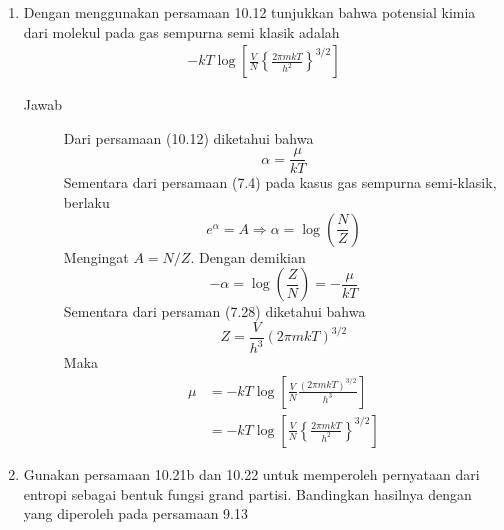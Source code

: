 \documentclass[a4paper , 12 pt]{article}
\begin{document}
\begin{enumerate}
\begin{description}
	\end{description}
\item
	Dengan menggunakan persamaan 10.12 tunjukkan bahwa potensial kimia dari molekul pada gas sempurna semi klasik adalah
	\begin{align}
	-k T \log \left [ \frac{V}{N} 
	 \left \{ \frac{2 \pi m k T}{h^2} \right \}^{3/2} 
	\right ] \nonumber
	\end{align}
	\begin{description}
	\item[Jawab]
	Dari persamaan (10.12) diketahui bahwa 
	\[
	\alpha = \frac{\mu}{kT} \tag{iii.1}
	\]
	Sementara dari persamaan (7.4) pada kasus gas sempurna semi-klasik, berlaku
	\[
	e^\alpha = A \Rightarrow  \alpha = \log \left(\frac{N}{Z}\right) 
	\]
	Mengingat $A = N/Z$. Dengan demikian
	\[
	-\alpha = \log \left(\frac{Z}{N}\right) = - \frac{\mu}{kT}
	\]
	Sementara dari persaman (7.28) diketahui bahwa
	\[
	Z = \frac{V}{h^3} (2\pi m kT)^{3/2}
	\]
	Maka 
	\begin{align}
	\mu & = - kT \log \left[\frac{V}{N}  \frac{(2\pi m kT)^{3/2}}{h^3} \right]   \nonumber \\
	& = - kT \log \left[  \frac{V}{N} \left\{  \frac{2\pi m kT}{h^2}\right \}^{3/2} \right ] \tag{QED}
	\end{align}
	\end{description}
\item 
	Gunakan persamaan 10.21b dan 10.22 untuk memperoleh pernyataan dari entropi sebagai bentuk fungsi grand partisi. Bandingkan hasilnya dengan yang diperoleh pada persamaan 9.13

\end{enumerate}
\end{document}
